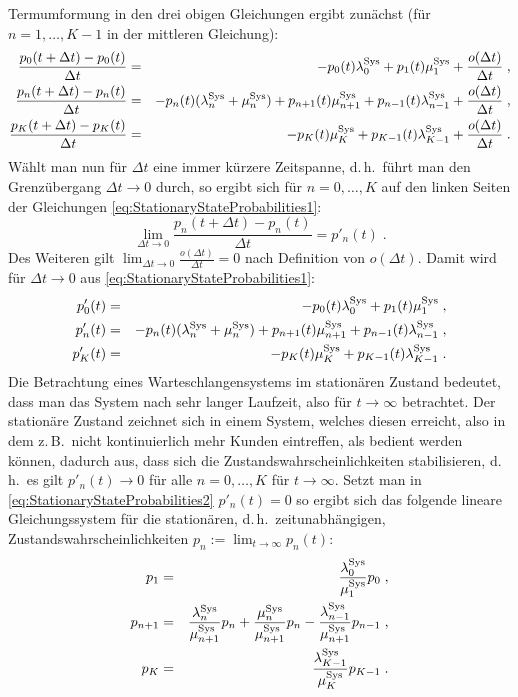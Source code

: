 \documentclass[a4paper,11pt,oneside]{article}
\theoremstyle{definition}
\begin{document}
Termumformung in den drei obigen Gleichungen ergibt zunächst (für $n=1,\ldots,K-1$ in der mittleren Gleichung):
\begin{eqnarray}
\frac{p_0(t+\Delta t)-p_0(t)}{\Delta t}&=&
-p_0(t)\lambda_0^{\rm Sys}+p_{1}(t)\mu_1^{\rm Sys}+\frac{o(\Delta t)}{\Delta t}\;,
\label{eq:StationaryStateProbabilities1}\\
\frac{p_n(t+\Delta t)-p_n(t)}{\Delta t}&=&
-p_n(t)(\lambda_n^{\rm Sys}+\mu_n^{\rm Sys})+p_{n+1}(t)\mu_{n+1}^{\rm Sys}+p_{n-1}(t)\lambda_{n-1}^{\rm Sys}+\frac{o(\Delta t)}{\Delta t}\;,
\nonumber\\
\frac{p_K(t+\Delta t)-p_K(t)}{\Delta t}&=&
-p_K(t)\mu_K^{\rm Sys}+p_{K-1}(t)\lambda_{K-1}^{\rm Sys}+\frac{o(\Delta t)}{\Delta t}\;.
\nonumber
\end{eqnarray}
Wählt man nun für $\Delta t$ eine immer kürzere Zeitspanne, d.\,h.\ führt man den Grenzübergang $\Delta t\to0$ durch, so ergibt sich für $n=0,\ldots,K$
auf den linken Seiten der Gleichungen \eqref{eq:StationaryStateProbabilities1}:
$$
\lim_{\Delta t\to0}\frac{p_n(t+\Delta t)-p_n(t)}{\Delta t}=p'_n(t)\;.
$$
Des Weiteren gilt $\lim_{\Delta t\to0}\frac{o(\Delta t)}{\Delta t}=0$ nach Definition von $o(\Delta t)$. Damit wird für $\Delta t\to0$ aus \eqref{eq:StationaryStateProbabilities1}:
\begin{eqnarray}
p'_0(t)&=&
-p_0(t)\lambda_0^{\rm Sys}+p_{1}(t)\mu_1^{\rm Sys}\;,
\nonumber\\
p'_n(t)&=&
-p_n(t)(\lambda_n^{\rm Sys}+\mu_n^{\rm Sys})+p_{n+1}(t)\mu_{n+1}^{\rm Sys}+p_{n-1}(t)\lambda_{n-1}^{\rm Sys}\;,
\label{eq:StationaryStateProbabilities2}\\
p'_K(t)&=&
-p_K(t)\mu_K^{\rm Sys}+p_{K-1}(t)\lambda_{K-1}^{\rm Sys}\;.
\nonumber
\end{eqnarray}
Die Betrachtung eines Warteschlangensystems im stationären Zustand bedeutet, dass man das System nach sehr langer Laufzeit, also für $t\to\infty$ betrachtet. Der stationäre Zustand zeichnet sich in einem System, welches diesen erreicht, also in dem z.\,B.\ nicht kontinuierlich mehr Kunden eintreffen, als bedient werden können, dadurch aus, dass sich die Zustandswahrscheinlichkeiten stabilisieren, d.\,h.\ es gilt $p'_n(t)\to0$ für alle $n=0,\ldots,K$ für $t\to\infty$.
Setzt man in \eqref{eq:StationaryStateProbabilities2}	$p'_n(t)=0$ so ergibt sich das folgende lineare Gleichungssystem für die stationären, d.\,h.\ zeitunabhängigen, Zustandswahrscheinlichkeiten $p_n:=\lim_{t\to\infty}p_n(t)$:
\begin{eqnarray}
p_1&=&
\frac{\lambda_0^{\rm Sys}}{\mu_1^{\rm Sys}}p_0\;,
\nonumber\\
p_{n+1}&=&
\frac{\lambda_n^{\rm Sys}}{\mu_{n+1}^{\rm Sys}}p_n+\frac{\mu_n^{\rm Sys}}{\mu_{n+1}^{\rm Sys}}p_n-\frac{\lambda_{n-1}^{\rm Sys}}{\mu_{n+1}^{\rm Sys}}p_{n-1}\;,
\label{eq:StationaryStateProbabilities3}\\
p_K&=&
\frac{\lambda_{K-1}^{\rm Sys}}{\mu_K^{\rm Sys}}p_{K-1}\;.
\nonumber
\end{eqnarray}
\end{document}
